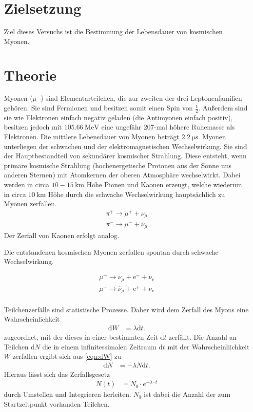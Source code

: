 \section{Zielsetzung}
\label{sec:Zielsetzung}
Ziel dieses Versuchs ist die Bestimmung der Lebensdauer von kosmischen Myonen.


\section{Theorie}
\label{sec:Theorie}

Myonen ($\mu^-$) sind Elementarteilchen, die zur zweiten der drei Leptonenfamilien gehören.
Sie sind Fermionen und besitzen somit einen Spin von $\frac{1}{2}$.
Außerdem sind sie wie Elektronen einfach negativ geladen (die Antimyonen einfach positiv), besitzen jedoch mit $\qty{105.66}{\mega\electronvolt}$
eine ungefähr 207-mal höhere Ruhemasse als Elektronen.
Die mittlere Lebensdauer von Myonen beträgt $\qty{2.2}{\micro\second}$. \cite{PDG}
Myonen unterliegen der schwachen und der elektromagnetischen Wechselwirkung.
Sie sind der Hauptbestandteil von sekundärer kosmischer Strahlung.
Diese entsteht, wenn primäre kosmische Strahlung (hochenergetische Protonen aus der Sonne uns anderen Sternen) mit Atomkernen
der oberen Atmosphäre wechselwirkt. Dabei werden in circa $10-\qty{15}{\kilo\meter}$ Höhe Pionen und Kaonen erzeugt,
welche wiederum in circa $\qty{10}{\kilo\meter}$ Höhe durch die schwache Wechselwirkung hauptsächlich zu Myonen zerfallen.
\begin{align*}
    \pi^+ \longrightarrow \mu^+ + \nu_{\mu} \\
    \pi^- \longrightarrow \mu^- + \overline{\nu}_{\mu}
\end{align*}
Der Zerfall von Kaonen erfolgt analog.

Die entstandenen kosmischen Myonen zerfallen spontan durch schwache Wechselwirkung.

\begin{align*}
    \mu^- \longrightarrow \nu_{\mu} + \text{e}^- + \overline{\nu}_{\text{e}} \\
    \mu^+ \longrightarrow \overline{\nu}_{\mu} + \text{e}^+ + \nu_{\text{e}} 
\end{align*}
\\

Teilchenzerfälle sind statistische Prozesse. Daher wird dem Zerfall des Myons
eine Wahrscheinlichkeit 
\begin{align}
    \text{d}W &= \lambda \text{d}t.
    \label{eqn:dW}
\end{align}
zugeordnet, mit der dieses in einer bestimmten Zeit $\text{d}t$ zerfällt.
Die Anzahl an Teilchen $\text{d}N$ die in einem infinitessimalen Zeitraum $\text{d}t$ mit der Wahrscheinliichkeit $W$ zerfallen ergibt sich
aus \eqref{eqn:dW} zu 
\begin{align*}
    \text{d}N &= -\lambda N\text{d}t.
\end{align*}
Hieraus lässt sich das Zerfallsgesetz 
\begin{align}
    N(t) &= N_0 \cdot e^{- \lambda \cdot t}\label{eqn:Zerfallsgesetz}
\end{align}
durch Umstellen und Integrieren herleiten. $N_0$ ist dabei die Anzahl der zum Startzeitpunkt vorhanden Teilchen. 

